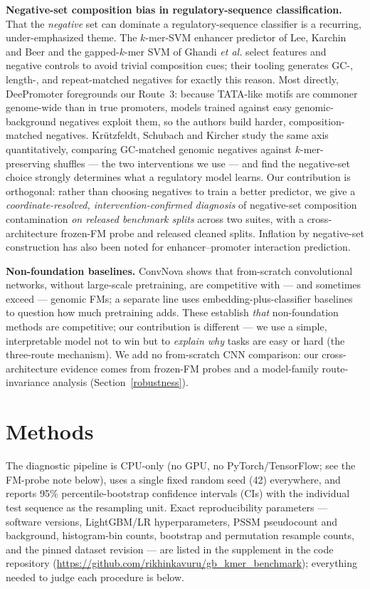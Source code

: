 \documentclass{ws-procs11x85}
\begin{document}
\textbf{Negative-set composition bias in regulatory-sequence classification.} That the \emph{negative}
set can dominate a regulatory-sequence classifier is a recurring, under-emphasized theme. The
$k$-mer-SVM enhancer predictor of Lee, Karchin and Beer\cite{lee2011} and the gapped-$k$-mer SVM of
Ghandi \emph{et al.}\cite{ghandi2014} select features and negative controls to avoid trivial composition
cues; their tooling generates GC-, length-, and repeat-matched negatives for exactly this
reason\cite{ghandi2016}. Most directly, DeePromoter\cite{deepromoter} foregrounds our Route~3: because
TATA-like motifs are commoner genome-wide than in true promoters, models trained against easy
genomic-background negatives exploit them, so the authors build harder, composition-matched negatives.
Kr\"utzfeldt, Schubach and Kircher\cite{krutzfeldt2020} study the same axis quantitatively, comparing
GC-matched genomic negatives against $k$-mer-preserving shuffles --- the two interventions we use --- and
find the negative-set choice strongly determines what a regulatory model learns. Our contribution is
orthogonal: rather than choosing negatives to train a better predictor, we give a \emph{coordinate-resolved,
intervention-confirmed diagnosis} of negative-set composition contamination \emph{on released benchmark
splits} across two suites, with a cross-architecture frozen-FM probe and released cleaned splits. Inflation
by negative-set construction has also been noted for enhancer--promoter interaction
prediction\cite{caofullwood}.

\textbf{Non-foundation baselines.} ConvNova\cite{convnova} shows that from-scratch convolutional networks,
without large-scale pretraining, are competitive with --- and sometimes exceed --- genomic FMs; a separate
line uses embedding-plus-classifier baselines\cite{embed,feng2025} to question how much pretraining adds.
These establish \emph{that} non-foundation methods are competitive; our contribution is different --- we
use a simple, interpretable model not to win but to \emph{explain why} tasks are easy or hard (the
three-route mechanism). We add no from-scratch CNN comparison: our cross-architecture evidence comes from
frozen-FM probes and a model-family route-invariance analysis (Section~\ref{robustness}).

\section{Methods}\label{methods}

The diagnostic pipeline is CPU-only (no GPU, no PyTorch/TensorFlow; see the FM-probe note below), uses a
single fixed random seed (42) everywhere, and reports 95\% percentile-bootstrap confidence intervals (CIs)
with the individual test sequence as the resampling unit. Exact reproducibility parameters --- software
versions, LightGBM/LR hyperparameters, PSSM pseudocount and background, histogram-bin counts, bootstrap
and permutation resample counts, and the pinned dataset revision --- are listed in the supplement
in the code repository (\url{https://github.com/rikhinkavuru/gb_kmer_benchmark}); everything needed to judge each procedure is below.
\end{document}
